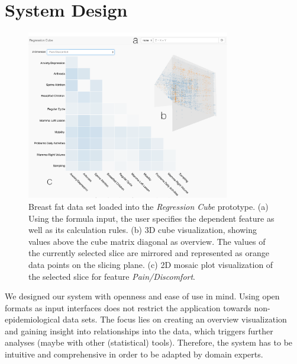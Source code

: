\documentclass[journal]{style/vgtc} 			          %
\newcommand{\com}[1]{\textcolor{orange}{\uline{#1}}}
\begin{document}
\section{System Design} \label{sec:SystemDesign}
\begin{figure}[htb]
 \centering
 \includegraphics[width=3.5in]{figures/system}
 \caption{
 Breast fat data set loaded into the \emph{Regression Cube} prototype.
 (a) Using the formula input, the user specifies the dependent feature as well as its calculation rules.
 (b) 3D cube visualization, showing values above the cube matrix diagonal as overview.
 The values of the currently selected slice are mirrored and represented as orange data points on the slicing plane.
 (c) 2D mosaic plot visualization of the selected slice for feature \emph{Pain/Discomfort}.
 }
  \label{fig:System}
\end{figure}
We designed our system with openness and ease of use in mind.
Using open formats as input interfaces does not restrict the application towards non-epidemiological data sets.
The focus lies on creating an overview visualization and gaining insight into relationships into the data, which triggers further analyses (maybe with other (statistical) tools).
Therefore, the system has to be intuitive and comprehensive in order to be adapted by domain experts.
\\\\
\end{document}
